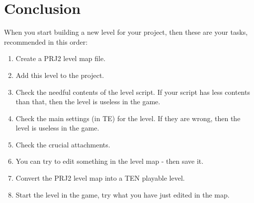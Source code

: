 \section{Conclusion}
When you start building a new level for your project, then these are your tasks, recommended in this order:
\begin{enumerate}
\item Create a PRJ2 level map file.
\item Add this level to the project.
\item Check the needful contents of the level script. If your script has less contents than that, then the level is useless in the game.
\item Check the main settings (in TE) for the level. If they are wrong, then the level is useless in the game.
\item Check the crucial attachments.
\item You can try to edit something in the level map - then save it.
\item Convert the PRJ2 level map into a TEN playable level.
\item Start the level in the game, try what you have just edited in the map.
\end{enumerate} \cite{akyv_tutorial}